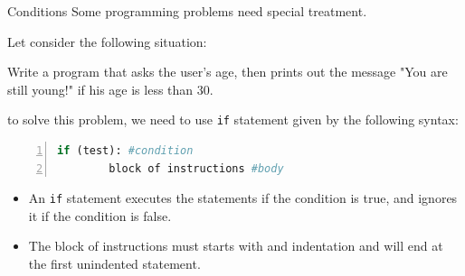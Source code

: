 \begin{frame}[fragile]{Conditions}
    Some programming problems need special treatment. 
    
    
    Let consider the following situation:
\begin{block}{}
Write a program that asks the user's age, then prints out the message "You are still young!" if his age is less than 30.
\end{block}
\pause 
to solve this problem, we need to use \texttt{if} statement given by the following syntax:
\begin{lstlisting}[numbers=left,showstringspaces=false,language=python] 
    if (test): #condition
        block of instructions #body
\end{lstlisting}
    \pause
\begin{itemize}[<+->]
    \item An \verb|if| statement executes the statements if the condition is true, and ignores it if the condition is false.
    \item The block of instructions must starts with and indentation and will end at the first unindented statement. 
\end{itemize}
\end{frame}
